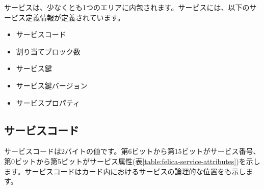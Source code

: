 \documentclass[a4paper]{report}
\begin{document}
サービスは、少なくとも1つのエリアに内包されます。サービスには、以下のサービス定義情報が定義されています。

\begin{itemize}
    \item サービスコード
    \item 割り当てブロック数
    \item サービス鍵
    \item サービス鍵バージョン
    \item サービスプロパティ
\end{itemize}

\subsection{サービスコード}

サービスコードは2バイトの値です。第6ビットから第15ビットがサービス番号、第0ビットから第5ビットがサービス属性(表\ref{table:felica-service-attributes})を示します。サービスコードはカード内におけるサービスの論理的な位置をも示します。
\end{document}
